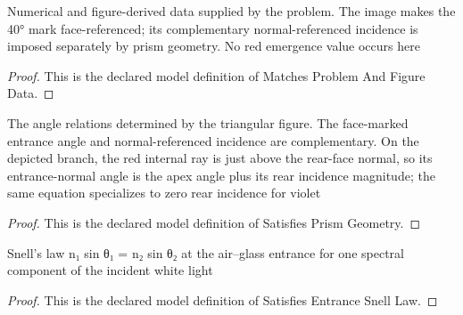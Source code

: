 \begin{definition}
  \label{def:physics:phyx-mini-0073:phyxminiproblems-problemphyxmini0073-matchesproblemandfiguredata}
  Numerical and figure-derived data supplied by the problem. The image makes the 40° mark face-referenced; its complementary normal-referenced incidence is imposed separately by prism geometry. No red emergence value occurs here
\end{definition}
\begin{proof}
  This is the declared model definition of Matches Problem And Figure Data.
\end{proof}
\begin{definition}
  \label{def:physics:phyx-mini-0073:phyxminiproblems-problemphyxmini0073-satisfiesprismgeometry}
  The angle relations determined by the triangular figure. The face-marked entrance angle and normal-referenced incidence are complementary. On the depicted branch, the red internal ray is just above the rear-face normal, so its entrance-normal angle is the apex angle plus its rear incidence magnitude; the same equation specializes to zero rear incidence for violet
\end{definition}
\begin{proof}
  This is the declared model definition of Satisfies Prism Geometry.
\end{proof}
\begin{definition}
  \label{def:physics:phyx-mini-0073:phyxminiproblems-problemphyxmini0073-satisfiesentrancesnelllaw}
  Snell's law n₁ sin θ₁ = n₂ sin θ₂ at the air--glass entrance for one spectral component of the incident white light
\end{definition}
\begin{proof}
  This is the declared model definition of Satisfies Entrance Snell Law.
\end{proof}
